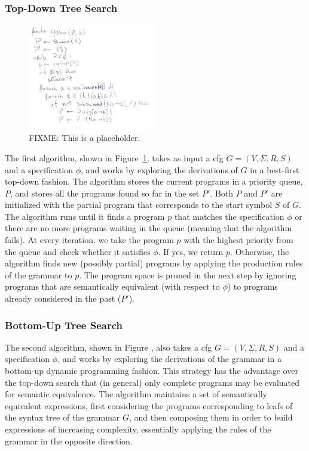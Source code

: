 \subsubsection{Top-Down Tree Search}
\label{sec:top-down-tree-search}

\begin{figure}
  \centering
  \includegraphics[width=0.5\textwidth]{assets/enum-top-down.png}
  \caption{FIXME: This is a placeholder.}
  \label{fig:enum-top-down}
\end{figure}

The first algorithm, shown in Figure~\ref{fig:enum-top-down}, takes as input a
\gls{cfg} $G = (V, \Sigma{}, R, S)$ and a specification $\phi{}$, and works by
exploring the derivations of $G$ in a best-first top-down fashion. The algorithm
stores the current programs in a priority queue, $P$, and stores all the
programs found so far in the set $P'$. Both $P$ and $P'$ are initialized with
the partial program that corresponds to the start symbol $S$ of $G$. The
algorithm runs until it finds a program $p$ that matches the specification
$\phi{}$ or there are no more programs waiting in the queue (meaning that the
algorithm fails). At every iteration, we take the program $p$ with the highest
priority from the queue and check whether it satisfies $\phi{}$. If yes, we
return $p$. Otherwise, the algorithm finds new (possibly partial) programs by
applying the production rules of the grammar to $p$. The program space is pruned
in the next step by ignoring programs that are semantically equivalent (with
respect to $\phi{}$) to programs already considered in the past ($P'$).

\subsubsection{Bottom-Up Tree Search}
\label{sec:bottom-up-tree-search}

The second algorithm, shown in Figure , also takes a \gls{cfg} $G = (V, \Sigma{}, R, S)$ and a specification
$\phi{}$, and works by exploring the derivations of the grammar in a bottom-up
dynamic programming fashion. This strategy has the advantage over the top-down
search that (in general) only complete programs may be evaluated for semantic
equivalence. The algorithm maintains a set of semantically equivalent
expressions, first considering the programs corresponding to leafs of the syntax
tree of the grammar $G$, and then composing them in order to build expressions
of increasing complexity, essentially applying the rules of the grammar in the
opposite direction.

